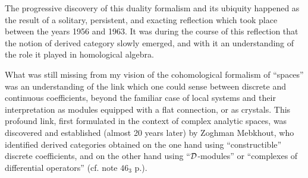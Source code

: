 The progressive discovery of this duality formalism 
and its ubiquity
happened as the result of a solitary, persistent, and exacting reflection which took place between
the years 1956 and 1963.
It was during the course of this reflection that the notion of derived category slowly
emerged, and with it an understanding of the role it played in homological algebra. 

What was still missing from my vision of the cohomological formalism of ``spaces'' was an
understanding of the link which one could sense between discrete and continuous
coefficients, beyond the familiar case of local systems 
and their interpretation as
modules equipped with a flat connection, or as crystals. 
This profound link, first formulated in the context of complex analytic spaces, was
discovered and established (almost 20 years later) by Zoghman Mebkhout,
who identified derived categories obtained on the one hand using ``constructible'' discrete coefficients, and on the other hand using ``$\mathcal{D}$-modules''
or ``complexes of differential operators'' (cf. note $46_3$ p.).

